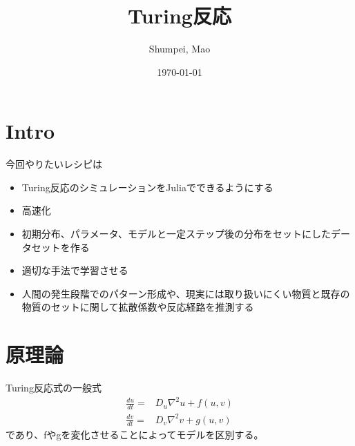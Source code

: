 \documentclass{jsarticle}
\title{Turing反応}
\author{Shumpei, Mao}
\date{\today}
\theoremstyle{definition}
\begin{document}
\maketitle

\setcounter{tocdepth}{3}
\tableofcontents


\part{Intro}\label{Intro}
今回やりたいレシピは
\begin{itemize}
    \item Turing反応のシミュレーションをJuliaでできるようにする
    \item 高速化
    \item 初期分布、パラメータ、モデルと一定ステップ後の分布をセットにしたデータセットを作る
    \item 適切な手法で学習させる
    \item 人間の発生段階でのパターン形成や、現実には取り扱いにくい物質と既存の物質のセットに関して拡散係数や反応経路を推測する
\end{itemize}

\part{原理論}\label{Theory}
Turing反応式の一般式
\begin{align}\label{Turing_reaction_eq}
    \frac{du}{dt}=&D_u \nabla^2 u+f(u,v)\\
    \frac{dv}{dt}=&D_v \nabla^2 v+g(u,v)
\end{align}
であり、fやgを変化させることによってモデルを区別する。
\end{document}
